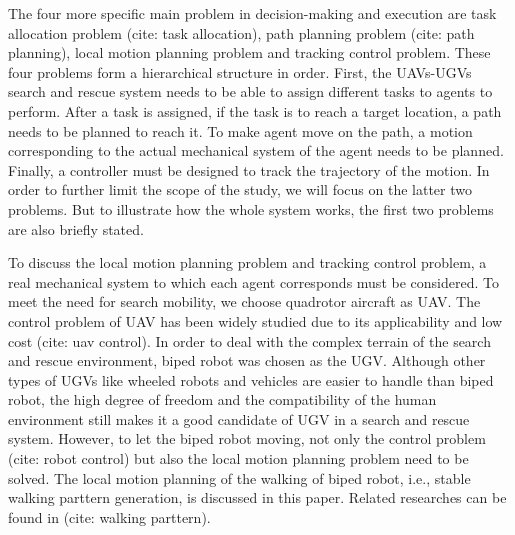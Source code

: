 \documentclass{ieeeaccess}
\begin{document}
The four more specific main problem in decision-making and execution are task allocation problem (cite: task allocation), path planning problem (cite: path planning), local motion planning problem and tracking control problem. These four problems form a hierarchical structure in order. First, the UAVs-UGVs search and rescue system needs to be able to assign different tasks to agents to perform. After a task is assigned, if the task is to reach a target location, a path needs to be planned to reach it. To make agent move on the path, a motion corresponding to the actual mechanical system of the agent needs to be planned. Finally, a controller must be designed to track the trajectory of the motion. In order to further limit the scope of the study, we will focus on the latter two problems. But to illustrate how the whole system works, the first two problems are also briefly stated.

To discuss the local motion planning problem and tracking control problem, a real mechanical system to which each agent corresponds must be considered. To meet the need for search mobility, we choose quadrotor aircraft as UAV. The control problem of UAV has been widely studied due to its applicability and low cost (cite: uav control). In order to deal with the complex terrain of the search and rescue environment, biped robot was chosen as the UGV. Although other types of UGVs like wheeled robots and vehicles are easier to handle than biped robot, the high degree of freedom and the compatibility of the human environment still makes it a good candidate of UGV in a search and rescue system. However, to let the biped robot moving, not only the control problem (cite: robot control) but also the local motion planning problem need to be solved. The local motion planning of the walking of biped robot, i.e., stable walking parttern generation, is discussed in this paper. Related researches can be found in (cite: walking parttern).
\end{document}
